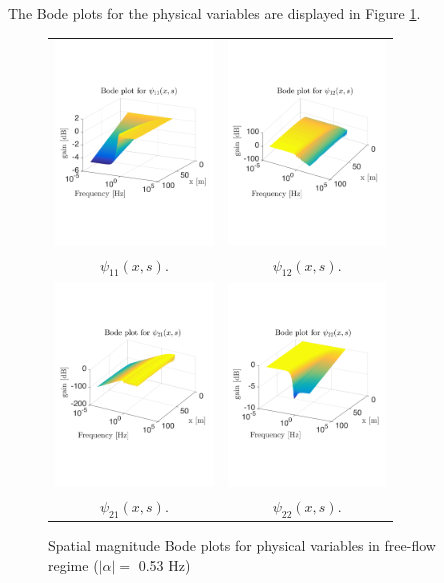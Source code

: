 \documentclass[letterpaper, 10 pt, conference]{ieeeconf}  %
\begin{document}
The Bode plots for the physical variables are displayed in Figure \ref{fig:Magn_spatial_physx}.

\begin{figure}
\centering
\begin{tabular}{cc}
\includegraphics[trim = 30mm 60mm 0mm 60mm, width = 4.2cm]{distr_psi_11}
&
\includegraphics[trim = 30mm 60mm 0mm 60mm, width = 4.2cm]{distr_psi_12}
\tabularnewline
$\psi_{11}(x,s)$.
&
$\psi_{12}(x,s)$.
\tabularnewline
\includegraphics[trim = 30mm 60mm 0mm 60mm, width = 4.2cm]{distr_psi_21}
&
\includegraphics[trim = 30mm 60mm 0mm 60mm, width = 4.2cm]{distr_psi_22}
\tabularnewline
$\psi_{21}(x,s)$.
&
$\psi_{22}(x,s)$.
\end{tabular}
\caption{Spatial magnitude Bode plots for physical variables in free-flow regime ($\left|\alpha\right| = $ 0.53 Hz)\label{fig:Magn_spatial_physx}}
\end{figure}
\end{document}
